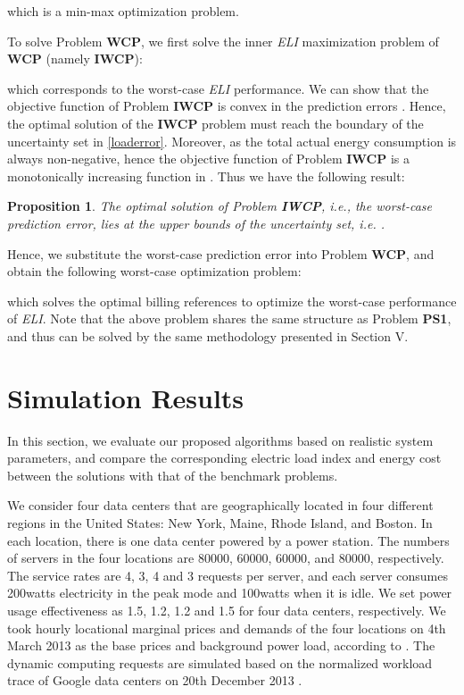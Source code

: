 \documentclass[journal]{IEEEtran}
\newtheorem{proposition}{Proposition}
\begin{document}
	
	which is a min-max optimization problem. 
		
	To solve Problem \textbf{WCP}, we first solve the inner \emph{ELI} maximization problem of \textbf{WCP} (namely \textbf{IWCP}):
		
	which corresponds to the worst-case \emph{ELI} performance. We can show that the objective function of Problem \textbf{IWCP} is convex in the prediction errors . Hence, the optimal solution of the \textbf{IWCP} problem must reach the boundary of the uncertainty set in \eqref{loaderror}. Moreover, as the total actual energy consumption  is always non-negative, hence the objective function of Problem \textbf{IWCP} is a monotonically increasing function in . Thus we have the following result:
	\begin{proposition}
		The optimal solution of Problem \textbf{IWCP}, \emph{i.e.}, the worst-case prediction error, lies at the upper bounds of the uncertainty set, \emph{i.e.} .
	\end{proposition}
    
    
    Hence, we substitute the worst-case prediction error  into Problem \textbf{WCP}, and obtain the following worst-case optimization problem:
    
    which solves the optimal billing references  to optimize the worst-case performance of \emph{ELI}. Note that the above problem shares the same structure as Problem \textbf{PS1}, and thus can be solved by the same methodology presented in Section V.
    
	
	\section{Simulation Results}
	In this section, we evaluate our proposed algorithms based on realistic system parameters, and compare the corresponding electric load index and energy cost between the solutions with that of the benchmark problems. 
	
	We consider four data centers that are geographically located in four different regions in the United States: New York, Maine, Rhode Island, and Boston. In each location, there is one data center powered by a power station. The numbers of servers in the four locations are 80000, 60000, 60000, and 80000, respectively. The service rates are 4, 3, 4 and 3 requests per server, and each server consumes 200watts electricity in the peak mode and 100watts when it is idle. We set power usage effectiveness as 1.5, 1.2, 1.2 and 1.5 for four data centers, respectively. We took hourly locational marginal prices and demands of the four locations on 4th March 2013 as the base prices and background power load, according to \cite{data1,data2}. The dynamic computing requests are simulated based on the normalized workload trace of Google data centers on 20th December 2013 \cite{data3,data4}.
	
\end{document}
